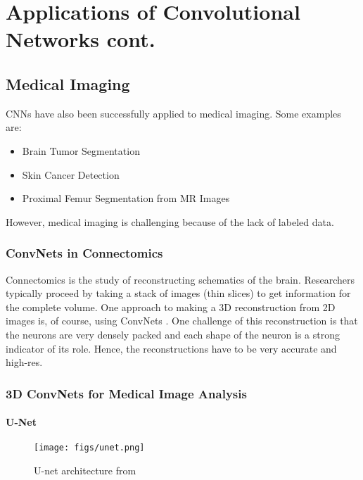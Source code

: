 \chapter{Applications of Convolutional Networks cont.}

\section{Medical Imaging}
CNNs have also been successfully applied to medical imaging. Some examples are:
\begin{itemize}
    \item Brain Tumor Segmentation \cite{braintumor2018}
    \item Skin Cancer Detection \cite{Esteva2017DermatologistlevelCO}
    \item Proximal Femur Segmentation from MR Images \cite{Deniz2018SegmentationOT}
\end{itemize}

However, medical imaging is challenging because of the lack of labeled data.

\subsection{ConvNets in Connectomics}
Connectomics is the study of reconstructing schematics of the brain. Researchers typically proceed by taking a stack of images (thin slices) to get information for the complete volume. One approach to making a 3D reconstruction from 2D images is, of course, using ConvNets \cite{jain2010}. One challenge of this reconstruction is that the neurons are very densely packed and each shape of the neuron is a strong indicator of its role. Hence, the reconstructions have to be very accurate and high-res.

\subsection{3D ConvNets for Medical Image Analysis}

\subsubsection{U-Net}
\begin{figure}[ht]
    \centering
    \texttt{[image: figs/unet.png]}
    \caption{U-net architecture from \citep{unet}}
    \label{fig:unet}
\end{figure}


